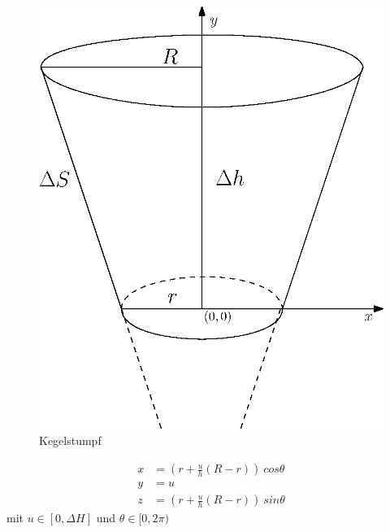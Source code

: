 \begin{figure}[!htb]
	\centering
	\includegraphics[scale=.7]{images/coneFrustum.eps}
	\caption{Kegelstumpf}
	\label{fig:coneFrustum}
\end{figure}


\begin{equation}
\begin{aligned}
x &= (r + \frac{u}{h} (R - r))~cos \theta \\
y &= u \\
z &= (r + \frac{u}{h} (R - r))~sin \theta
\end{aligned}
\end{equation}
mit $u\in [0, \Delta H]$ und $\theta \in [0, 2\pi)$


